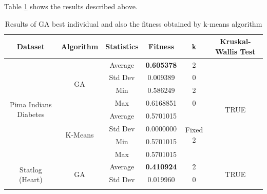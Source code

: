 \documentclass[journal]{IEEEtran}
\begin{document}
	Table \ref{results-ga-and-kmeans} shows the results described above. 
	
	\begin{table}[]
		\centering
		\caption{Results of GA best individual and also the fitness obtained by k-means algorithm}
		\label{results-ga-and-kmeans}
		\begin{tabular}{|c|c|c|c|c|c|}
			\hline
			\textbf{Dataset}           & \textbf{Algorithm} & \textbf{Statistics} & \textbf{Fitness} & \textbf{k}    & \textbf{Kruskal-Wallis Test}   \\ \hline
			\multirow{8}{*}{Pima Indians Diabetes} & \multirow{4}{*}{GA}           & Average                        & \textbf{0.605378}                    & 2                        & \multirow{8}{*}{TRUE} \\ \cline{3-5}
			&                               & Std Dev                        & 0.009389                    & 0                        &                       \\ \cline{3-5}
			&                               & Min                            & 0.586249                    & 2                        &                       \\ \cline{3-5}
			&                               & Max                            & 0.6168851                   & 0                        &                       \\ \cline{2-5}
			& \multirow{4}{*}{K-Means}      & Average                        & 0.5701015                   & \multirow{4}{*}{Fixed 2} &                       \\ \cline{3-4}
			&                               & Std Dev                        & 0.0000000                   &                          &                       \\ \cline{3-4}
			&                               & Min                            & 0.5701015                   &                          &                       \\ \cline{3-4}
			&                               & Max                            & 0.5701015                   &                          &                       \\ \hline
			\multirow{8}{*}{Statlog (Heart)}       & \multirow{4}{*}{GA}           & Average                        & \textbf{0.410924}                    & 2                        & \multirow{8}{*}{TRUE} \\ \cline{3-5}
			&                               & Std Dev                        & 0.019960                    & 0                        &                       \\ \cline{3-5}

\end{tabular}
\end{table}
\end{document}
